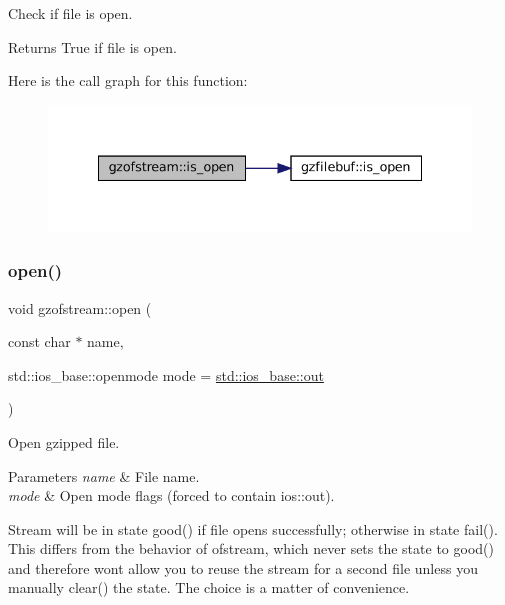 Check if file is open. 

\begin{DoxyReturn}{Returns}
True if file is open. 
\end{DoxyReturn}
Here is the call graph for this function\+:
\nopagebreak
\begin{figure}[H]
\begin{center}
\leavevmode
\includegraphics[width=335pt]{classgzofstream_acb1c9c6dccaf41bc5e44c2263ea48de3_cgraph}
\end{center}
\end{figure}
\mbox{\label{classgzofstream_aee3eb31f07eda7f5ad1f60d59ea4b239}} 
\subsubsection{\texorpdfstring{open()}{open()}}
{\footnotesize\ttfamily void gzofstream\+::open (\begin{DoxyParamCaption}\item[{const char $\ast$}]{name,  }\item[{std\+::ios\+\_\+base\+::openmode}]{mode = {\ttfamily \mbox{\hyperlink{gun_8c_acb2d4658684492100bc328998f52ae82}{std\+::ios\+\_\+base\+::out}}} }\end{DoxyParamCaption})}



Open gzipped file. 


\begin{DoxyParams}{Parameters}
{\em name} & File name. \\
\hline
{\em mode} & Open mode flags (forced to contain ios\+::out).\\
\hline
\end{DoxyParams}
Stream will be in state good() if file opens successfully; otherwise in state fail(). This differs from the behavior of ofstream, which never sets the state to good() and therefore won\textquotesingle{}t allow you to reuse the stream for a second file unless you manually clear() the state. The choice is a matter of convenience. \mbox{\label{classgzofstream_a2fef74202b114357f41cfeb28f1d2acc}} 
